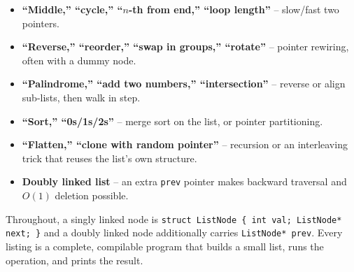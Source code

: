 \begin{patternbox}
\begin{itemize}
  \item \textbf{``Middle,'' ``cycle,'' ``$n$-th from end,'' ``loop
        length''} -- slow/fast two pointers.
  \item \textbf{``Reverse,'' ``reorder,'' ``swap in groups,'' ``rotate''}
        -- pointer rewiring, often with a dummy node.
  \item \textbf{``Palindrome,'' ``add two numbers,'' ``intersection''} --
        reverse or align sub-lists, then walk in step.
  \item \textbf{``Sort,'' ``0s/1s/2s''} -- merge sort on the list, or
        pointer partitioning.
  \item \textbf{``Flatten,'' ``clone with random pointer''} -- recursion or
        an interleaving trick that reuses the list's own structure.
  \item \textbf{Doubly linked list} -- an extra \texttt{prev} pointer makes
        backward traversal and $O(1)$ deletion possible.
\end{itemize}
\end{patternbox}

Throughout, a singly linked node is
\texttt{struct ListNode \{ int val; ListNode* next; \}} and a doubly linked
node additionally carries \texttt{ListNode* prev}. Every listing is a
complete, compilable program that builds a small list, runs the operation,
and prints the result.

\newpage


























